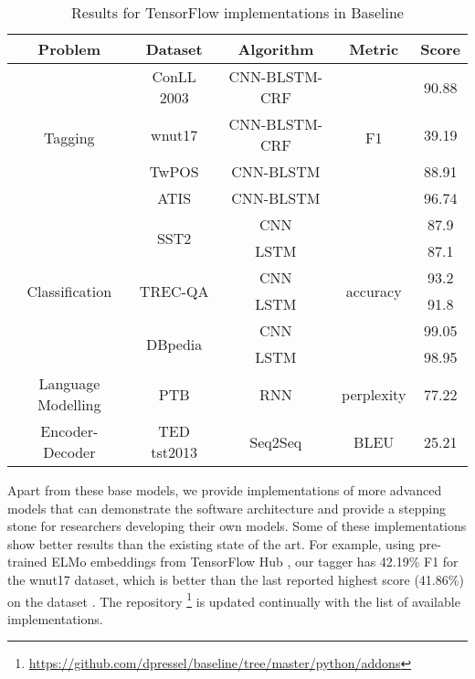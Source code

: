 \documentclass[11pt,a4paper]{article}
\begin{document}
\begin{table*}[]
\centering
\label{table:baselineresults}
\begin{tabular}{|c|c|c|c|c|}
\hline
Problem             & Dataset         & Algorithm   & Metric          & Score \\ \hline
\multirow{4}{*}{Tagging}    & ConLL 2003        & CNN-BLSTM-CRF   & \multirow{4}{*}{F1}    & 90.88 \\ \cline{2-3} \cline{5-5} 
                & wnut17          & CNN-BLSTM-CRF &              & 39.19 \\ \cline{2-3} \cline{5-5} 
                & TwPOS          & CNN-BLSTM   &              & 88.91 \\ \cline{2-3} \cline{5-5} 
                & ATIS           & CNN-BLSTM   &              & 96.74 \\ \hline
\multirow{6}{*}{Classification} & \multirow{2}{*}{SST2}  & CNN      & \multirow{6}{*}{accuracy} & 87.9 \\ \cline{3-3} \cline{5-5} 
                &             & LSTM     &              & 87.1 \\ \cline{2-3} \cline{5-5} 
                & \multirow{2}{*}{TREC-QA} & CNN      &              & 93.2 \\ \cline{3-3} \cline{5-5} 
                &             & LSTM     &              & 91.8 \\ \cline{2-3} \cline{5-5} 
                & \multirow{2}{*}{DBpedia} & CNN      &              & 99.05 \\ \cline{3-3} \cline{5-5} 
                &             & LSTM     &              & 98.95 \\ \hline
Language Modelling       & PTB           & RNN      & perplexity        & 77.22 \\ \hline
Encoder-Decoder      & TED tst2013       & Seq2Seq    & BLEU           & 25.21 \\ \hline
\end{tabular}
\caption{Results for TensorFlow implementations in Baseline}
\end{table*}


Apart from these base models, we provide implementations of more advanced models that can demonstrate the software architecture and provide a stepping stone for researchers developing their own models. Some of these implementations show better results than the existing state of the art. For example, using pre-trained ELMo embeddings from TensorFlow Hub \cite{peters2018deep:18}, our tagger has 42.19\% F1 for the wnut17 dataset, which is better than the last reported highest score (41.86\%) on the dataset \cite{DBLP:conf/aclnut/DerczynskiNEL17:17}. The repository \footnote{\url{https://github.com/dpressel/baseline/tree/master/python/addons}} is updated continually with the list of available implementations.      
\end{document}
